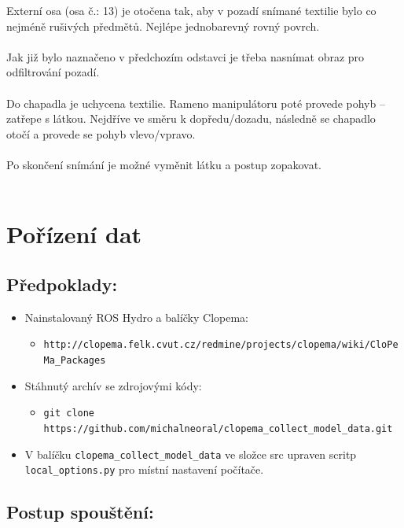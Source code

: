 \documentclass[10pt,a4paper,titlepage,oneside]{book}
\begin{document}
Externí osa (osa č.: 13) je otočena tak, aby v pozadí snímané textilie bylo co nejméně rušivých předmětů. Nejlépe jednobarevný rovný povrch.
\\
\\
Jak již bylo naznačeno v předchozím odstavci je třeba nasnímat obraz pro odfiltrování pozadí.\\
\\
Do chapadla je uchycena textilie. Rameno manipulátoru poté provede pohyb – zatřepe s látkou. Nejdříve ve směru k dopředu/dozadu, následně se chapadlo otočí a provede se pohyb vlevo/vpravo.\\
\\
Po skončení snímání je možné vyměnit látku a postup zopakovat.\\
\\

\section*{Pořízení dat}
\subsection*{Předpoklady:}

\begin{itemize}
  \item Nainstalovaný ROS Hydro a balíčky Clopema:
  \begin{itemize} 
  
  	\item \verb|http://clopema.felk.cvut.cz/redmine/projects/clopema/wiki/CloPeMa_Packages|
  \end{itemize}
  
  \item Stáhnutý archív se zdrojovými kódy:
  \begin{itemize}
  	\item \verb|git clone https://github.com/michalneoral/clopema_collect_model_data.git|
  \end{itemize}
  
  \item V balíčku \verb|clopema_collect_model_data| ve složce src upraven scritp \verb|local_options.py| pro místní nastavení počítače.
\end{itemize}


\subsection*{Postup spouštění:}
\end{document}

